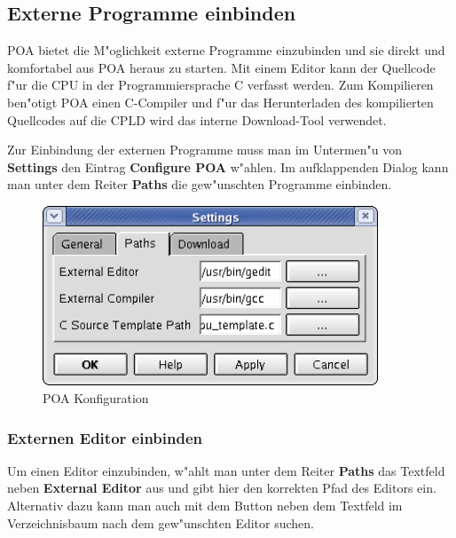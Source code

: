 \documentclass[a4paper,titlepage,12pt,ngerman]{scrbook}
\begin{document}
\subsection{Externe Programme einbinden}
POA bietet die M"oglichkeit externe Programme einzubinden und sie direkt und komfortabel aus POA heraus zu starten. Mit einem Editor kann der Quellcode f"ur die CPU in der Programmiersprache C  verfasst werden. Zum Kompilieren ben"otigt POA einen C-Compiler und f"ur das Herunterladen des kompilierten Quellcodes auf die CPLD wird das interne Download-Tool verwendet.\par
Zur Einbindung der externen Programme muss man im Untermen"u von {\bf Settings} den Eintrag {\bf Configure POA} w"ahlen. Im aufklappenden Dialog kann man unter dem Reiter {\bf Paths} die gew"unschten Programme einbinden.

\begin{figure}[htbp]

\begin{center}

\includegraphics[width=10cm]{POAConfiguration2}

\caption{POA Konfiguration}\label{test}

\end{center}

\end{figure}

\subsubsection{Externen Editor einbinden}
Um einen Editor einzubinden, w"ahlt man unter dem Reiter {\bf Paths} das Textfeld neben {\bf External Editor} aus und gibt hier den korrekten Pfad des Editors ein. Alternativ dazu kann man auch mit dem Button neben dem Textfeld im Verzeichnisbaum nach dem gew"unschten Editor suchen.\par
\end{document}
